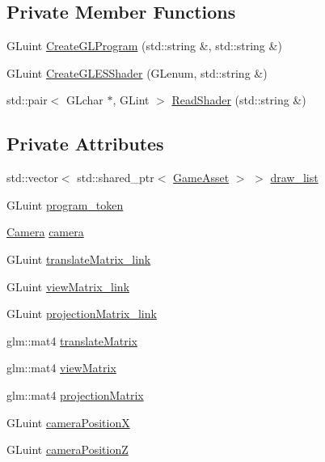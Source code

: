 \subsection*{Private Member Functions}
\begin{DoxyCompactItemize}
\item 
G\+Luint \hyperlink{class_game_asset_manager_abec45b44a8b35ad2d7d817ba10e0dd8d}{Create\+G\+L\+Program} (std\+::string \&, std\+::string \&)
\item 
G\+Luint \hyperlink{class_game_asset_manager_a1a1e5c07f941e8d3fda40d9442ac7037}{Create\+G\+L\+E\+S\+Shader} (G\+Lenum, std\+::string \&)
\item 
std\+::pair$<$ G\+Lchar $\ast$, G\+Lint $>$ \hyperlink{class_game_asset_manager_a23b124a213308a68a882727127601c97}{Read\+Shader} (std\+::string \&)
\end{DoxyCompactItemize}
\subsection*{Private Attributes}
\begin{DoxyCompactItemize}
\item 
std\+::vector$<$ std\+::shared\+\_\+ptr$<$ \hyperlink{class_game_asset}{Game\+Asset} $>$ $>$ \hyperlink{class_game_asset_manager_a671cddd92f1de4186c582fe0c4297b7d}{draw\+\_\+list}
\item 
G\+Luint \hyperlink{class_game_asset_manager_ad7bab17862e06ca692289f934b40548b}{program\+\_\+token}
\item 
\hyperlink{class_camera}{Camera} \hyperlink{class_game_asset_manager_af408912d75b4d97d29babc8850ecb8ae}{camera}
\item 
G\+Luint \hyperlink{class_game_asset_manager_a5e737710573e276ca53c683bc6731a51}{translate\+Matrix\+\_\+link}
\item 
G\+Luint \hyperlink{class_game_asset_manager_a71322a65c085d1d296e87aaddc4aea15}{view\+Matrix\+\_\+link}
\item 
G\+Luint \hyperlink{class_game_asset_manager_aa98eb0fb89a0a39e29be33294b322855}{projection\+Matrix\+\_\+link}
\item 
glm\+::mat4 \hyperlink{class_game_asset_manager_a1f0530749ec3ca5ee7925b2b70e8a8c2}{translate\+Matrix}
\item 
glm\+::mat4 \hyperlink{class_game_asset_manager_a4e702908c5d7d66e40c676d2c4f7930c}{view\+Matrix}
\item 
glm\+::mat4 \hyperlink{class_game_asset_manager_a2bc76e9ac72dcf9490436a59dc3bc752}{projection\+Matrix}
\item 
G\+Luint \hyperlink{class_game_asset_manager_a011295db68f0413a94700c5aa2778c45}{camera\+Position\+X}
\item 
G\+Luint \hyperlink{class_game_asset_manager_a076d00cef5f59a5038e168a0cc80420d}{camera\+Position\+Z}
\end{DoxyCompactItemize}



